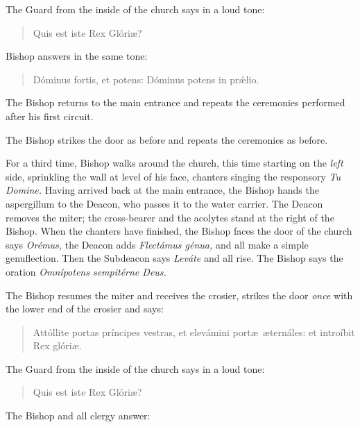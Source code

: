 \documentclass[letterpaper]{report}
\begin{document}
{    The Guard from the inside of the church says in a loud tone:

    \begin{quote}
       Quis est iste Rex Glóri\ae? 
    \end{quote}

    Bishop answers in the same tone:

    \begin{quote}
        Dóminus fortis, et potens: Dóminus potens in pr\'\ae lio.
    \end{quote}

    \rubric The Bishop returns to the main entrance and repeats the ceremonies performed
    after his first circuit.

    \rubric The Bishop strikes the door as before and repeats the ceremonies as before.

    \rubric For a third time, Bishop walks around the church, this time
    starting on the \textit{left} side, sprinkling the wall at level of his
    face, chanters singing the responsory \textit{Tu Domine.} Having arrived
    back at the main entrance, the Bishop hands the aspergillum to the Deacon,
    who passes it to the water carrier. The Deacon removes the miter; the
    cross-bearer and the acolytes stand at the right of the Bishop. When the
    chanters have finished, the Bishop faces the door of the church says
    \textit{Orémus,} the Deacon adds \textit{Flectámus génua,} and all make a
    simple genuflection. Then the Subdeacon says \textit{Leváte} and all rise.
    The Bishop says the oration \textit{Omnípotens sempitérne Deus.}


    \rubric The Bishop resumes the miter and receives the crosier, strikes the
    door \textit{once} with the lower end of the crosier and says:

    \begin{quote}
        Attóllite portas príncipes vestras, et elevámini port\ae\ \ae ternáles: et
        introíbit Rex glóri\ae.
    \end{quote}

    The Guard from the inside of the church says in a loud tone:

    \begin{quote}
       Quis est iste Rex Glóri\ae? 
    \end{quote}

    The Bishop and all clergy answer:

}
\end{document}
